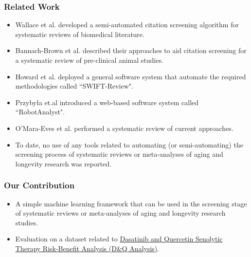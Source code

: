 \documentclass[10pt, xcolor={dvipsnames}]{beamer}
\begin{document}
\begin{frame}
\frametitle{Related Work}
\begin{itemize}
\item Wallace et al. developed a semi-automated citation screening algorithm
for systematic reviews of biomedical literature. 
\item Bannach-Brown et al. described their approaches to aid citation
screening for a systematic review of pre-clinical animal studies. 
\item Howard et al. deployed a general software system that automate the required methodologies called ``SWIFT-Review". 
\item Przybyła et.al introduced a web-based software system called ``RobotAnalyst". \item O'Mara-Eves et al. performed a systematic review of current approaches.
\item To date, no use of any tools related to automating (or semi-automating) the screening process of systematic reviews or meta-analyses of aging and longevity research was reported.
\end{itemize}
\end{frame}

\begin{frame}
\frametitle{Our Contribution}
\begin{itemize}
\item A simple machine learning framework that can be used in the screening stage of systematic reviews or meta-analyses of aging and longevity research studies.
\item Evaluation on a dataset related to \href{https://brain.forever-healthy.org/display/EN/}{Dasatinib and Quercetin Senolytic Therapy Risk-Benefit Analysis (D\&Q Analysis)}\footnotemark.
\end{itemize}
%
\end{frame}
\end{document}
